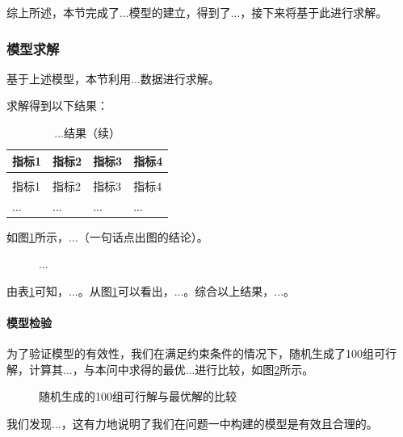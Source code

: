 综上所述，本节完成了...模型的建立，得到了...，接下来将基于此进行求解。

\subsubsection{模型求解}

基于上述模型，本节利用...数据进行求解。

求解得到以下结果：

\begin{longtable}{>{\centering\arraybackslash}p{}>{\centering\arraybackslash}p{}>{\centering\arraybackslash}p{}>{\centering\arraybackslash}p{}}
  \caption{...结果}
  \label{tab:结果1} \\
  \toprule
  指标1 & 指标2 & 指标3 & 指标4 \\
  \midrule
  \endfirsthead
  \caption{...结果（续）} \\
  \toprule
  指标1 & 指标2 & 指标3 & 指标4 \\
  \midrule
  \endhead
  \bottomrule
  \endfoot
  ... & ... & ... & ... \\
\end{longtable}

如图\ref{fig:result1}所示，...（一句话点出图的结论）。

\begin{figure}[H]
  \centering
  \caption{...}
  \label{fig:result1}
\end{figure}

由表\ref{tab:结果1}可知，...。从图\ref{fig:result1}可以看出，...。综合以上结果，...。

\paragraph{模型检验}

为了验证模型的有效性，我们在满足约束条件的情况下，随机生成了100组可行解，计算其...，与本问中求得的最优...进行比较，如图\ref{fig:check1}所示。

\begin{figure}[H]
  \centering
  \caption{随机生成的100组可行解与最优解的比较}
  \label{fig:check1}
\end{figure}

我们发现...，这有力地说明了我们在问题一中构建的模型是有效且合理的。
